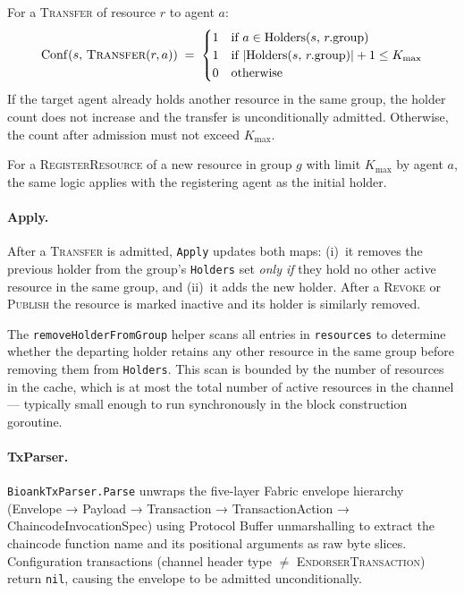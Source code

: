 For a \textsc{Transfer} of resource $r$ to agent $a$:
\[
  \mathrm{Conf}(s,\, \textsc{Transfer}(r, a))
  \;=\;
  \begin{cases}
    1 & \text{if } a \in \mathrm{Holders}(s,\, r.\text{group}) \\
    1 & \text{if } |\mathrm{Holders}(s,\, r.\text{group})| + 1 \leq K_\text{max} \\
    0 & \text{otherwise}
  \end{cases}
\]
If the target agent already holds another resource in the same group, the
holder count does not increase and the transfer is unconditionally admitted.
Otherwise, the count after admission must not exceed $K_\text{max}$.

For a \textsc{RegisterResource} of a new resource in group $g$ with limit
$K_\text{max}$ by agent $a$, the same logic applies with the registering agent
as the initial holder.

\paragraph{Apply.}
After a \textsc{Transfer} is admitted, \texttt{Apply} updates both maps:
(i)~it removes the previous holder from the group's \texttt{Holders} set
\emph{only if} they hold no other active resource in the same group, and
(ii)~it adds the new holder.  After a \textsc{Revoke} or \textsc{Publish}
the resource is marked inactive and its holder is similarly removed.

The \texttt{removeHolderFromGroup} helper scans all entries in
\texttt{resources} to determine whether the departing holder retains any
other resource in the same group before removing them from \texttt{Holders}.
This scan is bounded by the number of resources in the cache, which is at most
the total number of active resources in the channel — typically small enough to
run synchronously in the block construction goroutine.

\paragraph{TxParser.}
\texttt{BioankTxParser.Parse} unwraps the five-layer Fabric envelope hierarchy
(Envelope → Payload → Transaction → TransactionAction →
ChaincodeInvocationSpec) using Protocol Buffer unmarshalling to extract the
chaincode function name and its positional arguments as raw byte slices.
Configuration transactions (channel header type $\neq$ \textsc{EndorserTransaction})
return \texttt{nil}, causing the envelope to be admitted unconditionally.

